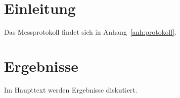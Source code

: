 \documentclass{scrartcl}
\begin{document}
\tableofcontents
\section{Einleitung}
Das Messprotokoll findet sich in
Anhang~\ref{anh:protokoll}.
\section{Ergebnisse}
Im Haupttext werden Ergebnisse diskutiert.
\appendix

\end{document}
